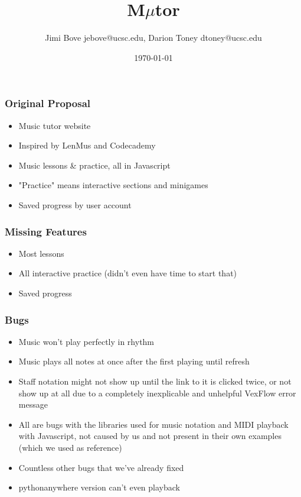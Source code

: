 \documentclass[24pt]{beamer}
\title{M$\mu$tor}
\author{Jimi Bove jebove@ucsc.edu, Darion Toney dtoney@ucsc.edu}
\date{\today}
\begin{document}
\maketitle

\begin{frame}
\frametitle{Original Proposal}
\begin{itemize}
  \item Music tutor website
  \item Inspired by LenMus and Codecademy
  \item Music lessons \& practice, all in Javascript
  \item "Practice" means interactive sections and minigames
  \item Saved progress by user account
\end{itemize}
\end{frame}

\begin{frame}
\frametitle{Missing Features}
\begin{itemize}
  \item Most lessons
  \item All interactive practice (didn't even have time to start that)
  \item Saved progress
\end{itemize}
\end{frame}

\begin{frame}
\frametitle{Bugs}
\begin{itemize}
  \item Music won't play perfectly in rhythm
  \item Music plays all notes at once after the first playing until refresh
  \item Staff notation might not show up until the link to it is clicked twice, or not show up at all due to a completely inexplicable and unhelpful VexFlow error message
  \item All are bugs with the libraries used for music notation and MIDI playback with Javascript, not caused by us and not present in their own examples (which we used as reference)
  \item Countless other bugs that we've already fixed
  \item pythonanywhere version can't even playback
\end{itemize}
\end{frame}
\end{document}
